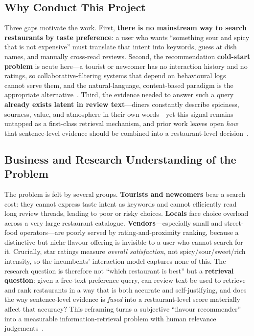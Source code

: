 \documentclass[10pt,twocolumn]{article}
\begin{document}
\subsection{Why Conduct This Project}
Three gaps motivate the work. First, \textbf{there is no mainstream way to search
restaurants by taste preference}: a user who wants ``something sour and spicy that is
not expensive'' must translate that intent into keywords, guess at dish names, and
manually cross-read reviews. Second, the recommendation \textbf{cold-start problem} is
acute here---a tourist or newcomer has no interaction history and no ratings, so
collaborative-filtering systems that depend on behavioural logs~\cite{koren2009mf}
cannot serve them, and the natural-language, content-based paradigm is the appropriate
alternative~\cite{gao2021crs,kostric2024usage}. Third, the evidence needed to answer
such a query \textbf{already exists latent in review text}---diners constantly describe
spiciness, sourness, value, and atmosphere in their own words---yet this signal remains
untapped as a first-class retrieval mechanism, and prior work leaves open \emph{how}
that sentence-level evidence should be combined into a restaurant-level
decision~\cite{rird2023,zhang2020explainable}.

\subsection{Business and Research Understanding of the Problem}
The problem is felt by several groups. \textbf{Tourists and newcomers} bear a search
cost: they cannot express taste intent as keywords and cannot efficiently read long
review threads, leading to poor or risky choices. \textbf{Locals} face choice overload
across a very large restaurant catalogue. \textbf{Vendors}---especially small and
street-food operators---are poorly served by rating-and-proximity ranking, because a
distinctive but niche flavour offering is invisible to a user who cannot search for it.
Crucially, star ratings measure \emph{overall satisfaction}, not spicy/sour/sweet/rich
intensity, so the incumbents' interaction model captures none of this. The research
question is therefore not ``which restaurant is best'' but a \textbf{retrieval
question}: given a free-text preference query, can review text be used to retrieve and
rank restaurants in a way that is both accurate and self-justifying, and does the way
sentence-level evidence is \emph{fused} into a restaurant-level score materially affect
that accuracy? This reframing turns a subjective ``flavour recommender'' into a
measurable information-retrieval problem with human relevance judgements~\cite{rird2023}.
\end{document}
